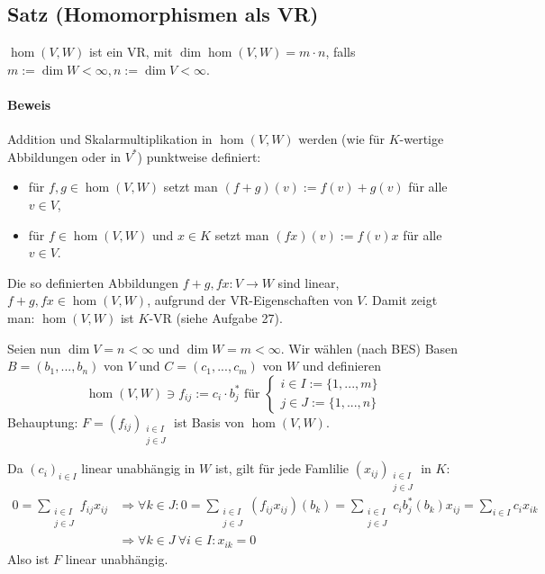  \subsection{Satz (Homomorphismen als VR)}
 	\begin{Satz}
 		$ \hom (V,W) $ ist ein VR, mit $\dim\hom (V,W) = m\cdot n$, falls $m:=\dim W<\infty, n:=\dim V< \infty$.
 	\end{Satz}
 	\paragraph{Beweis}
 		Addition und Skalarmultiplikation in $\hom (V,W)$ werden (wie für $K$-wertige Abbildungen oder in $V^*$) punktweise definiert:
 		\begin{itemize}
 			\item für $f,g \in \hom (V,W)$ setzt man $(f+g)(v) := f(v) + g(v)$ für alle $v\in V$,
 			\item für $f\in \hom (V,W)$ und $x\in K$ setzt man $(fx)(v) := f(v)x$ für alle $v\in V$.
 		\end{itemize}
 		Die so definierten Abbildungen $f+g,fx: V\to W$ sind linear, $f+g, fx\in \hom (V,W)$, aufgrund der VR-Eigenschaften von $V$. Damit zeigt man: $\hom (V,W)$ ist $K$-VR (siehe Aufgabe 27).

 		Seien nun $\dim V = n < \infty$ und $\dim W = m < \infty$.
 		Wir wählen (nach BES) Basen $B = (b_1,...,b_n)$ von $V$ und $C=(c_1,...,c_m)$ von $W$ und definieren
 		\begin{equation*}
 			\hom (V,W) \ni f_{ij}:= c_i\cdot b_j^* \text{ für }
 			\begin{cases}
 				i\in I := \{1,...,m\} \\
 				j\in J := \{1,...,n\}
 			\end{cases}
 		\end{equation*}
 		Behauptung: $F=(f_{ij})_{\substack{i\in I\\j \in J}}$ ist Basis von $\hom (V,W)$.

 		Da $(c_i)_{i\in I}$ linear unabhängig in $W$ ist, gilt für jede Famlilie $(x_{ij})_{\substack{i\in I\\j \in J}}$ in $K$:
 		\begin{align*}
 			0 = \sum_{\substack{i\in I \\j \in J}} f_{ij}x_{ij} &\Rightarrow \forall k \in J: 0 = \sum_{\substack{i\in I\\j \in J}} (f_{ij}x_{ij})(b_k) = \sum_{\substack{i\in I\\j \in J}} c_i b_j^* (b_k) x_{ij} = \sum_{i\in I} c_ix_{ik} \\
                                                                            & \Rightarrow \forall k\in J\ \forall i\in I:x_{ik} = 0
 		\end{align*}
 		Also ist $F$ linear unabhängig.

